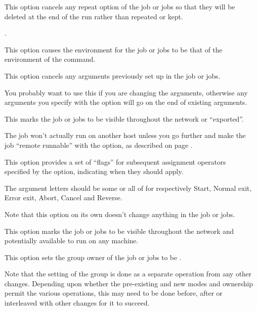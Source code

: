 
This option cancels any repeat option of the job or jobs so that they will be deleted at the end of the run rather than repeated or kept.


   \PrBtr{}.

This option causes the environment for the job or jobs to be that of the environment of the \PrBtjchange{} command.


This option cancels any arguments previously set up in the job or jobs.

You probably want to use this if you are changing the arguments, otherwise any arguments you specify with the  option will go on the end of existing arguments.


This marks the job or jobs to be visible throughout the network or ``exported''.

The job won't actually run on another host unless you go further and make the job ``remote runnable'' with the
 option, as described on page \pageref{btjchange:fullexport}.


This option provides a set of ``flags'' for subsequent assignment operators specified by the  option, indicating when they
should apply.

The argument letters should be some or all of  for respectively Start, Normal exit,
Error exit, Abort, Cancel and Reverse.

Note that this option on its own doesn't change anything in the job or jobs.


This option marks the job or jobs to be visible throughout the network and potentially available to run on any machine.


This option sets the group owner of the job or jobs to be .

Note that the setting of the group is done as a separate operation from any other changes. Depending upon whether the pre-existing and new
modes and ownership permit the various operations, this may need to be done before, after or interleaved with other changes for it to
succeed.

